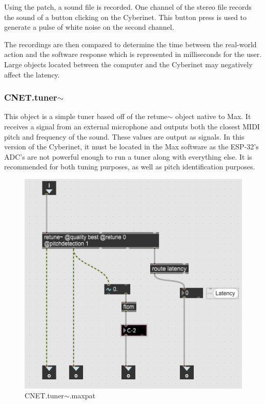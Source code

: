 Using the patch, a sound file is recorded. One channel of the stereo file records the sound of a button clicking on the Cyberinet. This button press is used to generate a pulse of white noise on the second channel.

The recordings are then compared to determine the time between the real-world action and the software response which is represented in milliseconds for the user. Large objects located between the computer and the Cyberinet may negatively affect the latency.

\subsubsection{CNET.tuner$\sim$}

This object is a simple tuner based off of the retune$\sim$ object native to Max. It receives a signal from an external microphone and outputs both the closest MIDI pitch and frequency of the sound. These values are output as signals. In this version of the Cyberinet, it must be located in the Max software as the ESP-32's ADC's are not powerful enough to run a tuner along with everything else. It is recommended for both tuning purposes, as well as pitch identification purposes. 

\begin{figure}
    \centering
    \includegraphics[scale=0.2]{diagrams/maxPatches/CNET.tuner~.png}
    \caption{CNET.tuner$\sim$.maxpat}
    \label{fig:CNET.tuner~.maxpat}
\end{figure}
 

